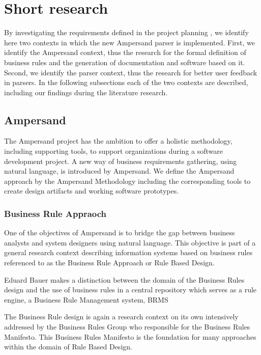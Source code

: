 
\section{Short research}
\label{sec:research}
By investigating the requirements defined in the project planning , we identify here two contexts in which the new Ampersand parser is implemented.
First, we identify the Ampersand context, thus the research for the formal definition of business rules and the generation of documentation and software based  on it.
Second, we identify the parser context, thus the research for better user feedback in parsers.
In the following subsections each of the two contexts are described, including our findings during the literature research.

\subsection{Ampersand}
The Ampersand project has the ambition to offer a holistic methodology, including supporting tools, to support organizations during a software development project.
A new way of business requirements gathering, using natural language, is introduced by Ampersand.
We define the Ampersand approach by the Ampersand Methodology including the corresponding tools to create design artifacts and working software prototypes.

\subsubsection{Business Rule Appraoch}
One of  the objectives of Ampersand is to bridge the gap between business analysts and system designers using natural language.
This objective is part of a general research context describing information systems based on business rules referenced to as the Business Rule Approach or Rule Based Design.

%
Eduard Bauer  makes a distinction between the domain of the Business Rules design and the use of business rules in a central repository which serves as a rule engine, a Business Rule Management system, BRMS

The Business Rule design is again a research context on its own intensively addressed by the Business Rules Group who responsible for the Business Rules Manifesto.
This Business Rules Manifesto is the foundation for many approaches within the domain of Rule Based Design.

